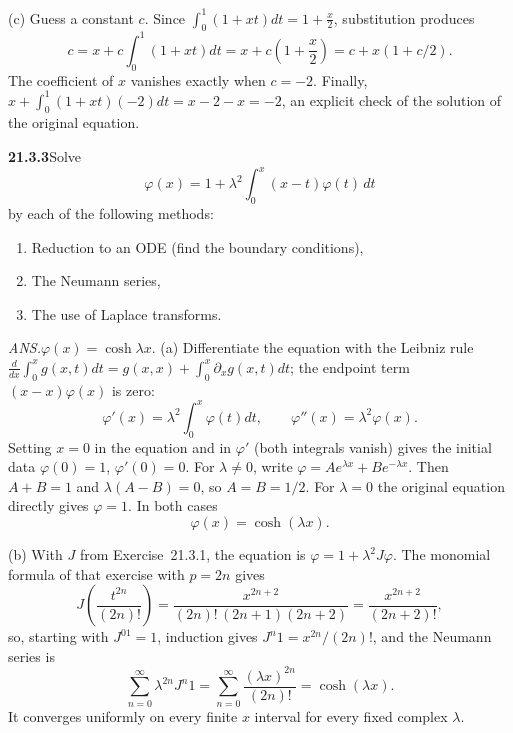 (c) Guess a constant $c$. Since $\int_0^1(1+xt)dt=1+\frac x2$,
substitution produces
\[
c=x+c\int_0^1(1+xt)dt=x+c\left(1+\frac x2\right)=c+x(1+c/2).
\]
The coefficient of $x$ vanishes exactly when $c=-2$.
Finally, $x+\int_0^1(1+xt)(-2)dt=x-2-x=-2$,
an explicit check of the solution of the original equation.


\par\bigskip
\noindent\textbf{21.3.3}\quad Solve
\[
\varphi(x)=1+\lambda^{2}\int_{0}^{x}(x-t)\varphi(t)\,dt
\]
by each of the following methods:
\begin{enumerate}
\item[(a)] Reduction to an ODE (find the boundary conditions),
\item[(b)] The Neumann series,
\item[(c)] The use of Laplace transforms.
\end{enumerate}
\par\nobreak\hfill\emph{ANS.}\enspace$\varphi(x)=\cosh\lambda x$.
\solution
(a) Differentiate the equation with the Leibniz rule
$\frac{d}{dx}\int_0^xg(x,t)dt=g(x,x)+\int_0^x\partial_xg(x,t)dt$;
the endpoint term $(x-x)\varphi(x)$ is zero:
\[
\varphi'(x)=\lambda^2\int_0^x\varphi(t)dt,\qquad
\varphi''(x)=\lambda^2\varphi(x).
\]
Setting $x=0$ in the equation and in $\varphi'$ (both integrals
vanish) gives the initial data $\varphi(0)=1$, $\varphi'(0)=0$.
For $\lambda\ne0$, write $\varphi=Ae^{\lambda x}+Be^{-\lambda x}$.
Then $A+B=1$ and $\lambda(A-B)=0$, so $A=B=1/2$.
For $\lambda=0$ the original equation directly gives $\varphi=1$.
In both cases
\[
\boxed{\varphi(x)=\cosh(\lambda x)}.
\]

(b) With $J$ from Exercise~21.3.1, the equation is
$\varphi=1+\lambda^2J\varphi$. The monomial formula of that exercise
with $p=2n$ gives
\[
J\!\left(\frac{t^{2n}}{(2n)!}\right)
=\frac{x^{2n+2}}{(2n)!\,(2n+1)(2n+2)}
=\frac{x^{2n+2}}{(2n+2)!},
\]
so, starting with $J^01=1$, induction gives $J^n1=x^{2n}/(2n)!$, and
the Neumann series is
\[
\sum_{n=0}^\infty\lambda^{2n}J^n1
=\sum_{n=0}^\infty\frac{(\lambda x)^{2n}}{(2n)!}
=\cosh(\lambda x).
\]
It converges uniformly on every finite $x$ interval for every fixed
complex $\lambda$.

